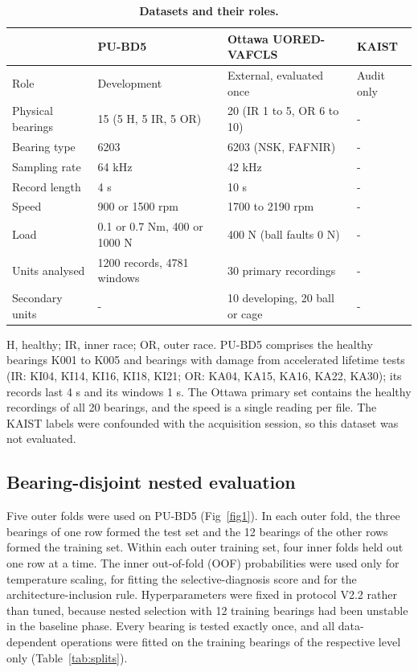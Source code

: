 \documentclass[10pt,letterpaper]{article}
\begin{document}
\begin{table}[!ht]
\centering
\caption{\textbf{Datasets and their roles.}}
{\footnotesize
\setlength{\tabcolsep}{4pt}
\renewcommand{\arraystretch}{1.25}
\begin{tabular}{llll}
\hline
 & PU-BD5 & Ottawa UORED-VAFCLS & KAIST \\
\hline
Role & Development & External, evaluated once & Audit only \\
Physical bearings & 15 (5 H, 5 IR, 5 OR) & 20 (IR 1 to 5, OR 6 to 10) & - \\
Bearing type & 6203 & 6203 (NSK, FAFNIR) & - \\
Sampling rate & 64 kHz & 42 kHz & - \\
Record length & 4 s & 10 s & - \\
Speed & 900 or 1500 rpm & 1700 to 2190 rpm & - \\
Load & 0.1 or 0.7 Nm, 400 or 1000 N & 400 N (ball faults 0 N) & - \\
Units analysed & 1200 records, 4781 windows & 30 primary recordings & - \\
Secondary units & - & 10 developing, 20 ball or cage & - \\
\hline
\end{tabular}}
\begin{flushleft} H, healthy; IR, inner race; OR, outer race. PU-BD5 comprises the healthy bearings K001 to K005 and bearings with damage from accelerated lifetime tests (IR: KI04, KI14, KI16, KI18, KI21; OR: KA04, KA15, KA16, KA22, KA30); its records last 4 s and its windows 1 s. The Ottawa primary set contains the healthy recordings of all 20 bearings, and the speed is a single reading per file. The KAIST labels were confounded with the acquisition session, so this dataset was not evaluated. \end{flushleft}
\label{tab:datasets}
\end{table}

\subsection*{Bearing-disjoint nested evaluation}
Five outer folds were used on PU-BD5 (Fig~\ref{fig1}). In each outer fold, the three bearings of one row formed the test set and the 12 bearings of the other rows formed the training set. Within each outer training set, four inner folds held out one row at a time. The inner out-of-fold (OOF) probabilities were used only for temperature scaling, for fitting the selective-diagnosis score and for the architecture-inclusion rule. Hyperparameters were fixed in protocol V2.2 rather than tuned, because nested selection with 12 training bearings had been unstable in the baseline phase. Every bearing is tested exactly once, and all data-dependent operations were fitted on the training bearings of the respective level only (Table~\ref{tab:splits}).
\end{document}
